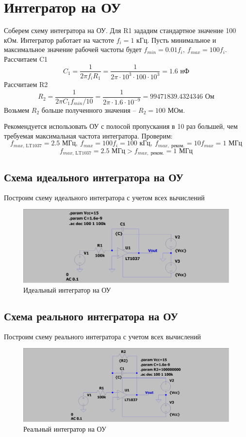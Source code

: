 \documentclass[a4paper, 12pt]{article}
\begin{document}
    \section{Интегратор на ОУ}
    Соберем схему интегратора на ОУ. Для R1 зададим стандартное значение 100 кОм.
    Интегратор работает на частоте $f_i=1$ кГц. Пусть минимальное и максимальное
    значение рабочей частоты будет $f_{min}=0.01f_i,\ f_{max}=100f_i$. Рассчитаем C1
    $$
    C_1=\dfrac{1}{2\pi f_i R_1}=\dfrac{1}{2\pi\cdot10^3\cdot100\cdot10^3}=1.6\text{ нФ}
    $$
    Рассчитаем R2
    $$
    R_2=\dfrac{1}{2\pi C_1 f_{min}/10}=\dfrac{1}{2\pi\cdot1.6\cdot10^{-9}}=99471839.4324346\text{ Ом}
    $$
    Возьмем $R_2$ больше полученного значения -- $R_2=100$ МОм.
    
    
    Рекомендуется использовать ОУ с полосой пропускания в 10 раз большей, чем требуемая максимальная
    частота интегратора. Проверим:
    $$
    f_{max,\,\text{LT1037}}=2.5\text{ МГц},\ f_{max}=100f_i=100\text{ кГц},\ f_{max,\text{ реком.}}=10f_{max}=1\text{ МГц}
    $$
    $$
    f_{max,\,\text{LT1037}}=2.5\text{ МГц}>f_{max,\text{ реком.}}=1\text{ МГц}
    $$


    \subsection{Схема идеального интегратора на ОУ}
    Построим схему идеального интегратора с учетом всех вычислений
    \begin{figure}[H]
        \centering
        \includegraphics[scale=0.22]{scheme6.png}
        \captionsetup{skip=0pt}
        \caption{Идеальный интегратор на ОУ}
        \label{fig:scheme6}
    \end{figure}


    \subsection{Схема реального интегратора на ОУ}
    Построим схему реального интегратора с учетом всех вычислений
    \begin{figure}[H]
        \centering
        \includegraphics[scale=0.22]{scheme7.png}
        \captionsetup{skip=0pt}
        \caption{Реальный интегратор на ОУ}
        \label{fig:scheme7}
    \end{figure}
\end{document}
